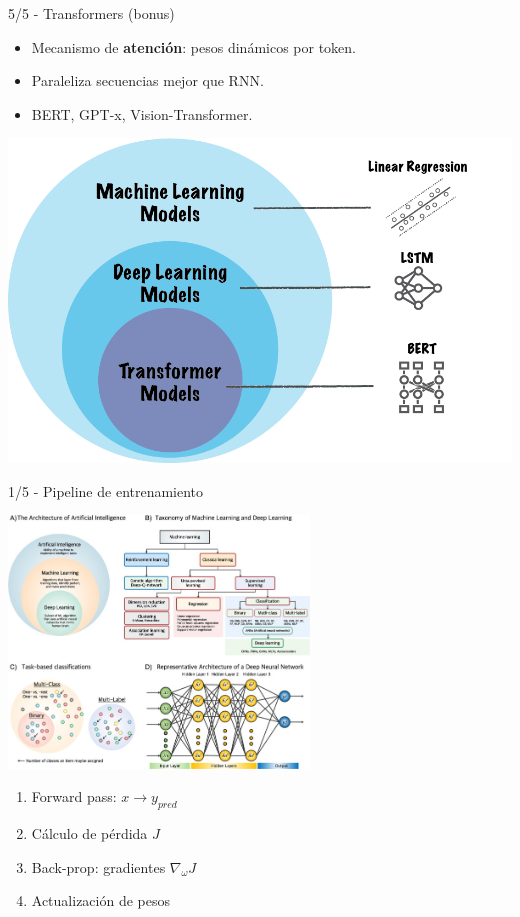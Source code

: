 \documentclass[8pt,spanish]{beamer}
\begin{document}
\begin{frame}{5/5  -  Transformers (bonus)}
  \begin{itemize}
    \item Mecanismo de \textbf{atención}: pesos dinámicos por token.
    \item Paraleliza secuencias mejor que RNN.
    \item BERT, GPT-x, Vision-Transformer.
  \end{itemize}
  \centering
  \includegraphics[width=.6\textwidth]{ml_models-transf.png}
\end{frame}

\begin{frame}[fragile]{1/5  -  Pipeline de entrenamiento}
  \begin{center}
    \includegraphics[width=0.6\textwidth]{Pipeline-training.jpg}
  \end{center}
  \begin{enumerate}
    \item Forward pass: \(x \rightarrow y_{pred}\)
    \item Cálculo de pérdida \(J\)
    \item Back-prop: gradientes \(\nabla_{\!\omega}J\)
    \item Actualización de pesos
  \end{enumerate}
\end{frame}
\end{document}
